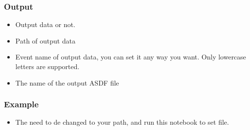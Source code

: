 \documentclass[a4paper,10pt,english,openany]{sphinxmanual}
\begin{document}
\subsubsection{Output}
\label{\detokenize{tutorials/S2_Syn_Waveform:output}}
\begin{itemize}
\item {} 
Output data or not.

\end{itemize}

\begin{itemize}
\item {} 
Path of output data

\end{itemize}

\begin{itemize}
\item {} 
Event name of output data, you can set it any way you want. Only lowercase letters are supported.

\end{itemize}

\begin{itemize}
\item {} 
The name of the output ASDF file

\end{itemize}


\subsubsection{Example}
\label{\detokenize{tutorials/S2_Syn_Waveform:example}}\begin{itemize}
\item {} 
The  need to de changed to your path, and run this notebook to set  file.

\end{itemize}
\end{document}
